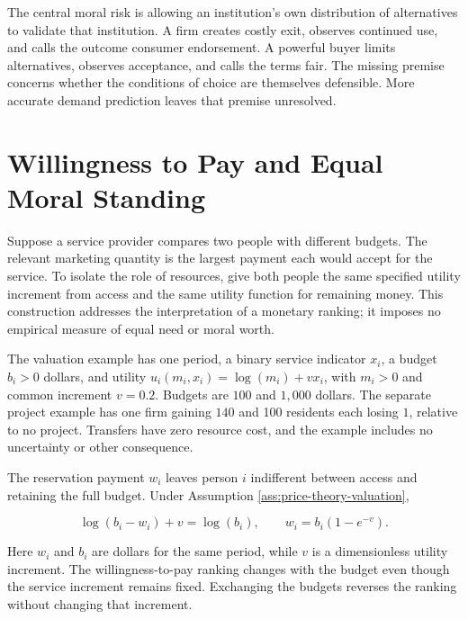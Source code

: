 The central moral risk is allowing an institution's own distribution of
alternatives to validate that institution. A firm creates costly exit,
observes continued use, and calls the outcome consumer endorsement. A
powerful buyer limits alternatives, observes acceptance, and calls the
terms fair. The missing premise concerns whether the conditions of
choice are themselves defensible. More accurate demand prediction leaves
that premise unresolved.


\hypertarget{M09-willingness-to-pay-and-equal-moral-standing}{%
\section{Willingness to Pay and Equal Moral
Standing}\label{M09-willingness-to-pay-and-equal-moral-standing}}

\noindent \noindent Suppose a service provider compares two people with different
budgets. The relevant marketing quantity is the largest payment each
would accept for the service. To isolate the role of resources, give
both people the same specified utility increment from access and the
same utility function for remaining money. This construction addresses
the interpretation of a monetary ranking; it imposes no empirical
measure of equal need or moral worth.

\begin{assumption}\label{ass:price-theory-valuation}
The valuation example has one period, a binary service indicator $x_i$, a budget $b_i>0$ dollars, and utility $u_i(m_i,x_i)=\log(m_i)+v x_i$, with $m_i>0$ and common increment $v=0.2$. Budgets are $100$ and $1{,}000$ dollars. The separate project example has one firm gaining $140$ and 100 residents each losing $1$, relative to no project. Transfers have zero resource cost, and the example includes no uncertainty or other consequence.
\end{assumption}

The reservation payment \(w_i\) leaves person \(i\) indifferent between
access and retaining the full budget. Under Assumption
\ref{ass:price-theory-valuation},

\[\log(b_i-w_i)+v=\log(b_i),\qquad
w_i=b_i(1-e^{-v}).\]

Here \(w_i\) and \(b_i\) are dollars for the same period, while \(v\) is
a dimensionless utility increment. The willingness-to-pay ranking
changes with the budget even though the service increment remains fixed.
Exchanging the budgets reverses the ranking without changing that
increment.

